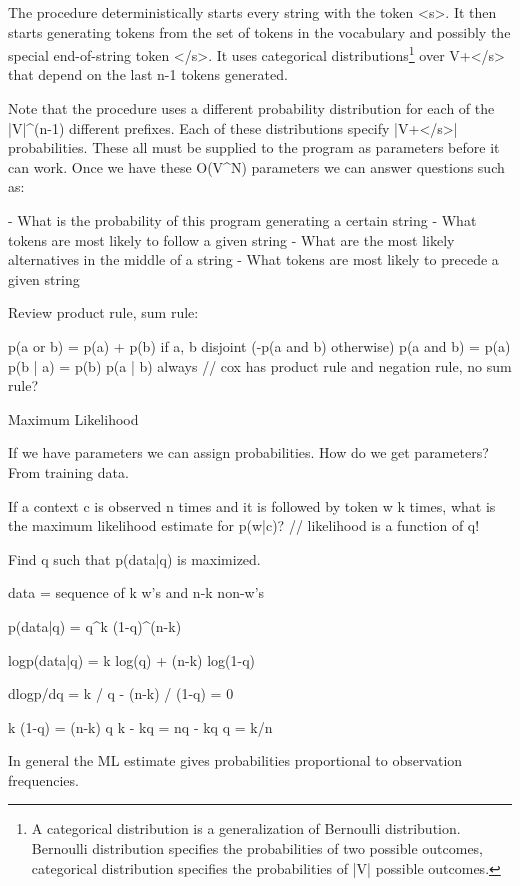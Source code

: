 The procedure deterministically starts every string with the token
<s>.  It then starts generating tokens from the set of tokens in the
vocabulary and possibly the special end-of-string token </s>.  It uses
categorical distributions\footnote{A categorical distribution is a
  generalization of Bernoulli distribution.  Bernoulli distribution
  specifies the probabilities of two possible outcomes, categorical
  distribution specifies the probabilities of |V| possible outcomes.}
over V+</s> that depend on the last n-1 tokens generated.

Note that the procedure uses a different probability distribution for
each of the |V|^(n-1) different prefixes.  Each of these distributions
specify |V+</s>| probabilities.  These all must be supplied to the
program as parameters before it can work.  Once we have these O(V^N)
parameters we can answer questions such as:

- What is the probability of this program generating a certain string
- What tokens are most likely to follow a given string
- What are the most likely alternatives in the middle of a string
- What tokens are most likely to precede a given string

Review product rule, sum rule:

p(a or b) = p(a) + p(b) if a, b disjoint (-p(a and b) otherwise)
p(a and b) = p(a) p(b | a) = p(b) p(a | b)  always
// cox has product rule and negation rule, no sum rule?



Maximum Likelihood

If we have parameters we can assign probabilities.  How do we get
parameters?  From training data.

If a context c is observed n times and it is followed by token w k
times, what is the maximum likelihood estimate for p(w|c)?
// likelihood is a function of q!

Find q such that p(data|q) is maximized.

data = sequence of k w's and n-k non-w's

p(data|q) = q^k (1-q)^(n-k)

logp(data|q) = k log(q) + (n-k) log(1-q)

dlogp/dq = k / q - (n-k) / (1-q) = 0

k (1-q)  = (n-k) q
k - kq = nq - kq
q = k/n

In general the ML estimate gives probabilities proportional to
observation frequencies.



